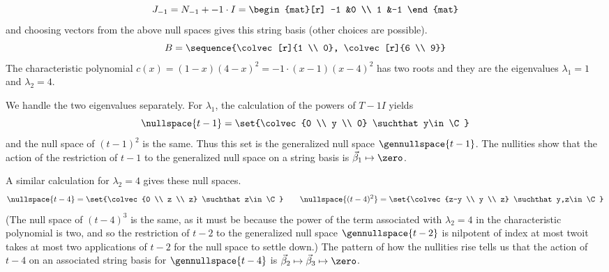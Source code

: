 \begin{exercises}
\begin{answer}
\begin{exparts}
\begin{equation*}
             J_{-1}=N_{-1}+-1\cdot I
             =
             \begin{mat}[r]
               -1  &0  \\
                1  &-1
             \end{mat}
           \end{equation*}
           and choosing vectors from the above null spaces gives
           this string basis (other choices are possible).
           \begin{equation*}
             B=\sequence{\colvec[r]{1 \\ 0},
                         \colvec[r]{6 \\ 9}}
           \end{equation*}
        \partsitem The characteristic polynomial 
            \( c(x)=(1-x)(4-x)^2=-1\cdot (x-1)(x-4)^2 \) has two roots
            and they are the eigenvalues $\lambda_1=1$ and $\lambda_2=4$.

            We handle the two eigenvalues separately.
            For $\lambda_1$, the calculation of the powers of $T-1I$
            yields
            \begin{equation*}
              \nullspace{t-1}=\set{\colvec{0 \\ y \\ 0}
                                      \suchthat y\in\C}
            \end{equation*}
            and the null space of $(t-1)^2$ is the same.
            Thus this set is the generalized null space 
            $\gennullspace{t-1}$.
            The nullities show that the action of the restriction of $t-1$ 
            to the generalized null space on a string basis
            is  $\vec{\beta}_1\mapsto\zero$.

            A similar calculation for $\lambda_2=4$ gives these null spaces.
            \begin{equation*}
              \nullspace{t-4}=\set{\colvec{0 \\ z \\ z}
                                      \suchthat z\in\C}
              \qquad
              \nullspace{(t-4)^2}=\set{\colvec{z-y \\ y \\ z}
                                          \suchthat y,z\in\C}
            \end{equation*}
            (The null space of $(t-4)^3$ is the same, as it must be because
            the power of the term associated with $\lambda_2=4$ in the
            characteristic polynomial is two, and so the restriction of
            $t-2$ to the generalized null space $\gennullspace{t-2}$
            is nilpotent of index at most two\Dash it takes at most
            two applications of $t-2$ for the null space to settle down.)
            The pattern of how the nullities rise tells us that
             the action of $t-4$ on an associated string basis 
            for $\gennullspace{t-4}$ is 
            $\vec{\beta}_2\mapsto\vec{\beta}_3\mapsto\zero$.


\end{exparts}
\end{answer}
\end{exercises}

